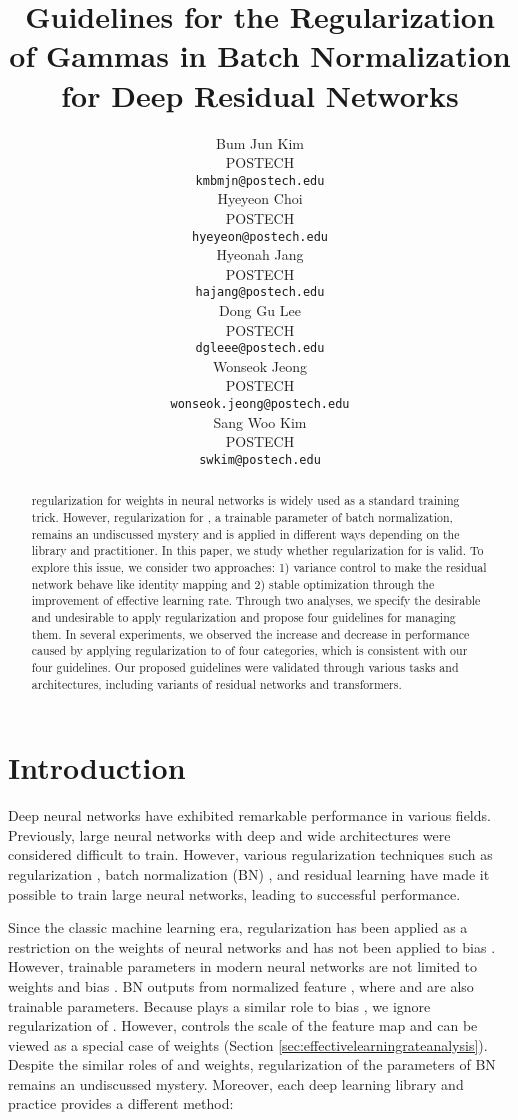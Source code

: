 \documentclass{article}
\title{Guidelines for the Regularization of Gammas in Batch Normalization for Deep Residual Networks}
\author{Bum Jun Kim \\
    POSTECH \\
\texttt{kmbmjn@postech.edu} \\
    \And
    Hyeyeon Choi \\
    POSTECH \\
\texttt{hyeyeon@postech.edu} \\
    \AND
    Hyeonah Jang \\
    POSTECH \\
\texttt{hajang@postech.edu} \\
    \And
    Dong Gu Lee \\
    POSTECH \\
\texttt{dgleee@postech.edu} \\
    \And
    Wonseok Jeong \\
    POSTECH \\
\texttt{wonseok.jeong@postech.edu} \\
    \And
    Sang Woo Kim \\
    POSTECH \\
\texttt{swkim@postech.edu} \\
}
\begin{document}
\maketitle


\begin{abstract}
	 regularization for weights in neural networks is widely used as a standard training trick. However,  regularization for , a trainable parameter of batch normalization, remains an undiscussed mystery and is applied in different ways depending on the library and practitioner. In this paper, we study whether  regularization for  is valid. To explore this issue, we consider two approaches: 1) variance control to make the residual network behave like identity mapping and 2) stable optimization through the improvement of effective learning rate. Through two analyses, we specify the desirable and undesirable  to apply  regularization and propose four guidelines for managing them. In several experiments, we observed the increase and decrease in performance caused by applying  regularization to  of four categories, which is consistent with our four guidelines. Our proposed guidelines were validated through various tasks and architectures, including variants of residual networks and transformers.
\end{abstract}

\section{Introduction}
\label{sec:introduction}
Deep neural networks have exhibited remarkable performance in various fields. Previously, large neural networks with deep and wide architectures were considered difficult to train. However, various regularization techniques such as  regularization \cite{giclr/ZhangWXG19}, batch normalization (BN) \cite{gicml/IoffeS15}, and residual learning \cite{gcvpr/HeZRS16} have made it possible to train large neural networks, leading to successful performance.

Since the classic machine learning era,  regularization has been applied as a restriction on the weights  of neural networks and has not been applied to bias . However, trainable parameters in modern neural networks are not limited to weights  and bias . BN outputs  from normalized feature , where  and  are also trainable parameters. Because  plays a similar role to bias , we ignore  regularization of . However,  controls the scale of the feature map and can be viewed as a special case of weights (Section \ref{sec:effectivelearningrateanalysis}).
Despite the similar roles of  and weights,  regularization of the  parameters of BN remains an undiscussed mystery. Moreover, each deep learning library and practice provides a different method:
\end{document}
